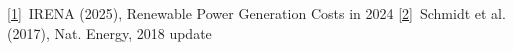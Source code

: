 \href{https://www.irena.org/-/media/Files/IRENA/Agency/Publication/2025/Jul/IRENA_TEC_RPGC_in_2024_2025.pdf}{[1]}~IRENA (2025), Renewable Power Generation Costs in 2024\quad
\href{https://doi.org/10.1038/nenergy.2017.110}{[2]}~Schmidt et al. (2017), Nat. Energy, 2018 update
